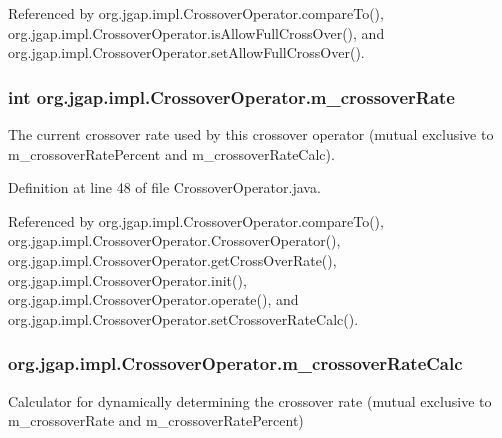 Referenced by org.\-jgap.\-impl.\-Crossover\-Operator.\-compare\-To(), org.\-jgap.\-impl.\-Crossover\-Operator.\-is\-Allow\-Full\-Cross\-Over(), and org.\-jgap.\-impl.\-Crossover\-Operator.\-set\-Allow\-Full\-Cross\-Over().

\hypertarget{classorg_1_1jgap_1_1impl_1_1_crossover_operator_aa52cbe6354a3465bccfed04dae06ee1a}{
\subsubsection[{m\-\_\-crossover\-Rate}]{\setlength{\rightskip}{0pt plus 5cm}int org.\-jgap.\-impl.\-Crossover\-Operator.\-m\-\_\-crossover\-Rate\hspace{0.3cm}{\ttfamily [private]}}}\label{classorg_1_1jgap_1_1impl_1_1_crossover_operator_aa52cbe6354a3465bccfed04dae06ee1a}
The current crossover rate used by this crossover operator (mutual exclusive to m\-\_\-crossover\-Rate\-Percent and m\-\_\-crossover\-Rate\-Calc). 

Definition at line 48 of file Crossover\-Operator.\-java.



Referenced by org.\-jgap.\-impl.\-Crossover\-Operator.\-compare\-To(), org.\-jgap.\-impl.\-Crossover\-Operator.\-Crossover\-Operator(), org.\-jgap.\-impl.\-Crossover\-Operator.\-get\-Cross\-Over\-Rate(), org.\-jgap.\-impl.\-Crossover\-Operator.\-init(), org.\-jgap.\-impl.\-Crossover\-Operator.\-operate(), and org.\-jgap.\-impl.\-Crossover\-Operator.\-set\-Crossover\-Rate\-Calc().

\hypertarget{classorg_1_1jgap_1_1impl_1_1_crossover_operator_a61a6063cd362c344fd4d394657d81976}{
\subsubsection[{m\-\_\-crossover\-Rate\-Calc}]{ org.\-jgap.\-impl.\-Crossover\-Operator.\-m\-\_\-crossover\-Rate\-Calc\hspace{0.3cm}{\ttfamily [private]}}}\label{classorg_1_1jgap_1_1impl_1_1_crossover_operator_a61a6063cd362c344fd4d394657d81976}
Calculator for dynamically determining the crossover rate (mutual exclusive to m\-\_\-crossover\-Rate and m\-\_\-crossover\-Rate\-Percent) 

